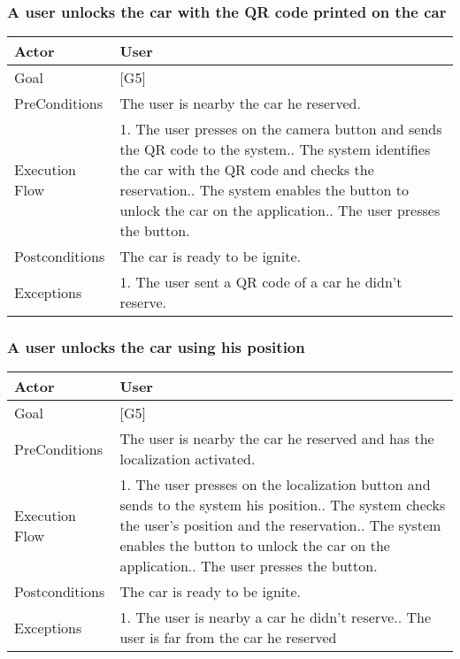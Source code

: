 \documentclass[english]{article}
\begin{document}
	\subsubsection{A user unlocks the car with the QR code printed on the car} 	\begin{tabularx}{\textwidth}{  l  X  } 		\hline 		Actor & User\\ 		\hline 		Goal & [G5]\\ 		\hline 		PreConditions & The user is nearby the car he reserved.\\ 		\hline 		Execution Flow & 1. The user presses on the camera button and sends the QR code to the system.\newline 										 2. The system identifies the car with the QR code and checks the reservation.\newline 										 3. The system enables the button to unlock the car on the application.\newline 										 4. The user presses the button.\\ 		\hline 		Postconditions & The car is ready to be ignite.\\ 		\hline 		Exceptions & 1. The user sent a QR code of a car he didn't reserve.\\ 		\hline 	\end{tabularx}
	\subsubsection{A user unlocks the car using his position} 	\begin{tabularx}{\textwidth}{  l  X  } 		\hline 		Actor & User\\ 		\hline 		Goal & [G5]\\ 		\hline 		PreConditions & The user is nearby the car he reserved and has the localization activated.\\ 		\hline 		Execution Flow & 1. The user presses on the localization button and sends to the system his position.\newline 										 2. The system checks the user's position and the reservation.\newline 										 3. The system enables the button to unlock the car on the application.\newline 										 4. The user presses the button.\\ 		\hline 		Postconditions & The car is ready to be ignite.\\ 		\hline 		Exceptions & 1. The user is nearby a car he didn't reserve.\newline 								 2. The user is far from the car he reserved\newline\\ 		\hline 	\end{tabularx}
\end{document}
